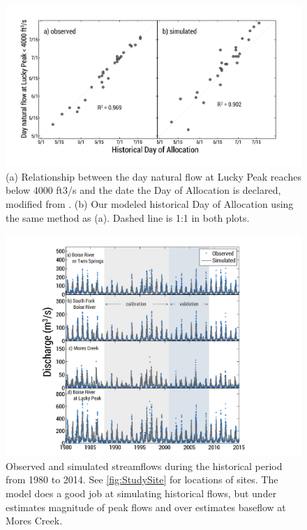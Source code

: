 \documentclass[water,article,submit,moreauthors,pdftex,10pt,a4paper]{mdpi}
\theoremstyle{mdpi}
\newcounter{ex}
\newcounter{re}
\theoremstyle{mdpidefinition}
\begin{document}
\begin{figure}
\centering
\includegraphics[width=\textwidth]{figure-files/figure6.png}
\caption{(a) Relationship between the day natural flow at Lucky Peak reaches below 4000 ft3/s and the date the Day of Allocation is declared, modified from \citep{Garst:2017bg}.  (b) Our modeled historical Day of Allocation using the same method as (a). Dashed line is 1:1 in both plots.}
\label{fig:DayOfAllocation}
\end{figure}
\clearpage

\begin{figure}
\centering
\includegraphics[width=\textwidth]{figure-files/figure7.png}
\caption{Observed and simulated streamflows during the historical period from 1980 to 2014. See \cref{fig:StudySite} for locations of sites. The model does a good job at simulating historical flows, but under estimates magnitude of peak flows and over estimates baseflow at Mores Creek.}
\label{fig:CalVal}
\end{figure}
\clearpage
\end{document}
